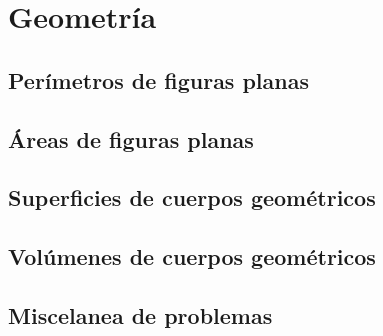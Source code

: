 \chapter{Geometría}
\section{Perímetros de figuras planas}
\section{Áreas de figuras planas}
\section{Superficies de cuerpos geométricos}
\section{Volúmenes de cuerpos geométricos}
\section{Miscelanea de problemas}